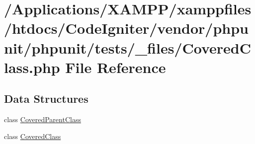 \hypertarget{phpunit_2tests_2__files_2_covered_class_8php}{}\section{/\+Applications/\+X\+A\+M\+P\+P/xamppfiles/htdocs/\+Code\+Igniter/vendor/phpunit/phpunit/tests/\+\_\+files/\+Covered\+Class.php File Reference}
\label{phpunit_2tests_2__files_2_covered_class_8php}
\subsection*{Data Structures}
\begin{DoxyCompactItemize}
\item 
class \mbox{\hyperlink{class_covered_parent_class}{Covered\+Parent\+Class}}
\item 
class \mbox{\hyperlink{class_covered_class}{Covered\+Class}}
\end{DoxyCompactItemize}
